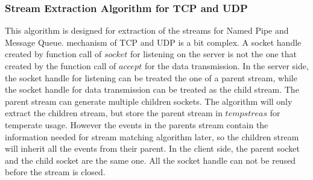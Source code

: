 \subsubsection{Stream Extraction Algorithm for TCP and UDP}
This algorithm is designed for extraction of the streams for Named Pipe and Message Queue. mechanism of TCP and UDP is a bit complex. A socket handle created by function call of $socket$ for listening on the server is not the one that created by the function call of $accept$ for the data transmission. In the server side, the socket handle for listening can be treated the one of a parent stream, while the socket handle for data transmission can be treated as the child stream. The parent stream can generate multiple children sockets. The algorithm will only extract the children stream, but store the parent stream in $tempstreas$ for temperate usage. However the events in the parents stream contain the information needed for stream matching algorithm later, so the children stream will inherit all the events from their parent. In the client side, the parent socket and the child socket are the same one. All the socket handle can not be reused before the stream is closed.
